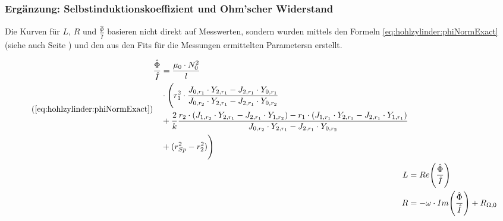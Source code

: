 %        
\clearpage
\subsubsection{Erg\"anzung: Selbstinduktionskoeffizient und Ohm'scher Widerstand}
\label{sec:ausw:subsec:hohlz:cu:subsubsec:LR}

Die    Kurven     f\"ur    $L$,    $R$     und    $\frac{\hat{\Phi}}{\hat{I}}$
basieren    nicht   direkt    auf   Messwerten,    sondern   wurden    mittels
den    Formeln    \ref{eq:hohlzylinder:phiNormExact}   (siehe    auch    Seite
\pageref{eq:hohlzylinder:phiNormExact})  und  den  aus   den  Fits  f\"ur  die
Messungen ermittelten Parametersn erstellt.

\begin{align*}
    \tag{\ref{eq:hohlzylinder:phiNormExact}}
    \begin{split}
    \frac{\hat{\Phi}}{\hat{I}} & = \frac{\mu_0 \cdot N_0^2}{l} \\
                               & \cdot \Biggl( r_1^2 \cdot \frac{J_{0,r_1} \cdot Y_{2,r_1} - J_{2,r_1} \cdot Y_{0,r_1}}{J_{0,r_2} \cdot Y_{2,r_1} - J_{2,r_1} \cdot Y_{0,r_2}} \\
                               & + \frac{2}{k} \frac{r_2 \cdot (J_{1,r_2} \cdot Y_{2,r_1} - J_{2,r_1} \cdot Y_{1,r_2}) - r_1 \cdot (J_{1,r_1} \cdot Y_{2,r_1} - J_{2,r_1} \cdot Y_{1,r_1})}{J_{0,r_2} \cdot Y_{2,r_1} - J_{2,r_1} \cdot Y_{0,r_2}} \\
                               & + (r_{Sp}^2 - r_2^2) \Biggr)
    \end{split} \\
    L & = Re \Biggl(\frac{\hat{\Phi}}{\hat{I}} \Biggr) \\
    R & = - \omega \cdot Im \Biggl(\frac{\hat{\Phi}}{\hat{I}} \Biggr) + R_{\Omega,0}
\end{align*}


